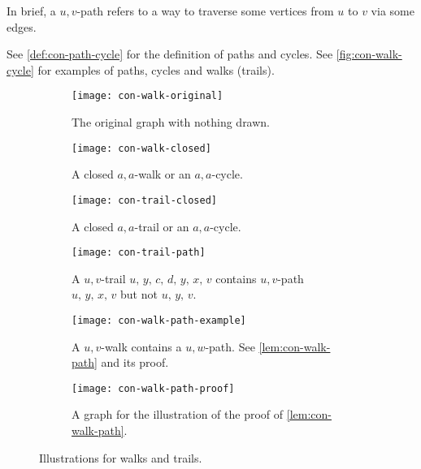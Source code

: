 \documentclass[../src/handouts/main.tex]{subfiles}
\begin{document}
In brief, a $u,v$-path refers to a way to traverse some vertices from $u$ to $v$ via some edges.

See \cref{def:con-path-cycle} for the definition of paths and cycles. See \cref{fig:con-walk-cycle} for examples of paths, cycles and walks (trails).

\begin{figure}[htbp]
  \centering
  \begin{subfigure}[t]{.4\textwidth}
    \centering
    \texttt{[image: con-walk-original]}
    \caption{The original graph with nothing drawn.}
    \label{fig:con-walk-original}
  \end{subfigure}
  \hspace{.1\textwidth}
  \begin{subfigure}[t]{.4\textwidth}
    \centering
    \texttt{[image: con-walk-closed]}
    \caption{A closed $a,a$-walk or an $a,a$-cycle.}
    \label{fig:con-walk-closed}
  \end{subfigure}

  \vspace{2em}

  \begin{subfigure}[t]{.4\textwidth}
    \centering
    \texttt{[image: con-trail-closed]}
    \caption{A closed $a,a$-trail or an $a,a$-cycle.}
    \label{fig:con-trail-closed}
  \end{subfigure}
  \hspace{.1\textwidth}
  \begin{subfigure}[t]{.4\textwidth}
    \centering
    \texttt{[image: con-trail-path]}
    \caption{A $u,v$-trail $u,\, y,\, c,\, d,\, y,\, x,\, v$ contains $u,v$-path $u,\, y,\, x,\, v$ but not $u,\, y,\, v$.}
    \label{fig:con-trail-path}
  \end{subfigure}

  \vspace{2em}

  \begin{subfigure}[t]{.4\textwidth}
    \centering
    \texttt{[image: con-walk-path-example]}
    \caption{A $u,v$-walk contains a $u,w$-path. See \cref{lem:con-walk-path} and its proof.}
    \label{fig:con-walk-path-example}
  \end{subfigure}
  \hspace{.1\textwidth}
  \begin{subfigure}[t]{.4\textwidth}
    \centering
    \texttt{[image: con-walk-path-proof]}
    \caption{A graph for the illustration of the proof of \cref{lem:con-walk-path}.}
    \label{fig:con-walk-path-proof}
  \end{subfigure}

  \caption{Illustrations for walks and trails.}
  \label{fig:con-walk-trail}
\end{figure}
\end{document}
